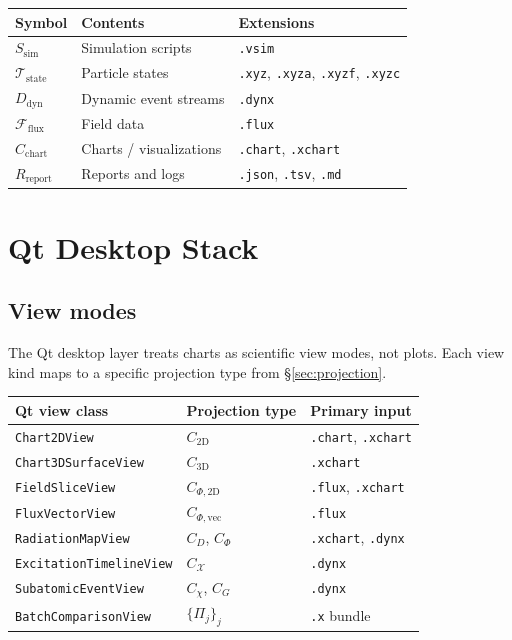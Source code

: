 \documentclass[11pt, a4paper, oneside]{article}
\newcommand{\Proj}{\Pi}                  %
\begin{document}
\begin{center}
\begin{tabular}{lll}
  \toprule
  Symbol & Contents & Extensions \\
  \midrule
  $S_{\mathrm{sim}}$        & Simulation scripts     & \texttt{.vsim} \\
  $\mathcal{T}_{\mathrm{state}}$ & Particle states   & \texttt{.xyz}, \texttt{.xyza}, \texttt{.xyzf}, \texttt{.xyzc} \\
  $D_{\mathrm{dyn}}$        & Dynamic event streams  & \texttt{.dynx} \\
  $\mathcal{F}_{\mathrm{flux}}$ & Field data         & \texttt{.flux} \\
  $C_{\mathrm{chart}}$      & Charts / visualizations & \texttt{.chart}, \texttt{.xchart} \\
  $R_{\mathrm{report}}$     & Reports and logs       & \texttt{.json}, \texttt{.tsv}, \texttt{.md} \\
  \bottomrule
\end{tabular}
\end{center}

\section{Qt Desktop Stack}
\label{sec:qt}

\subsection{View modes}

The Qt desktop layer treats charts as scientific view modes, not plots.
Each view kind maps to a specific projection type from \S\ref{sec:projection}.

\begin{center}
\begin{tabular}{lll}
  \toprule
  Qt view class & Projection type & Primary input \\
  \midrule
  \texttt{Chart2DView}           & $C_{\mathrm{2D}}$         & \texttt{.chart}, \texttt{.xchart} \\
  \texttt{Chart3DSurfaceView}    & $C_{\mathrm{3D}}$         & \texttt{.xchart} \\
  \texttt{FieldSliceView}        & $C_{\Phi,\mathrm{2D}}$    & \texttt{.flux}, \texttt{.xchart} \\
  \texttt{FluxVectorView}        & $C_{\Phi,\mathrm{vec}}$   & \texttt{.flux} \\
  \texttt{RadiationMapView}      & $C_D$, $C_\Phi$           & \texttt{.xchart}, \texttt{.dynx} \\
  \texttt{ExcitationTimelineView}& $C_\mathcal{X}$           & \texttt{.dynx} \\
  \texttt{SubatomicEventView}    & $C_\chi$, $C_G$           & \texttt{.dynx} \\
  \texttt{BatchComparisonView}   & $\{\Proj_j\}_j$           & \texttt{.x} bundle \\
  \bottomrule
\end{tabular}
\end{center}
\end{document}
